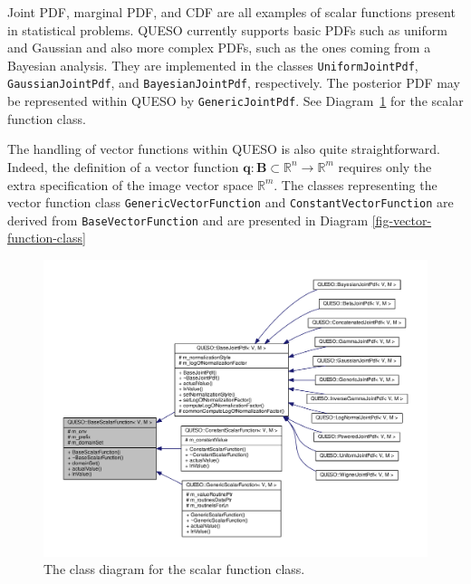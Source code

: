 Joint PDF, marginal PDF, and CDF are all examples of scalar functions present in statistical problems. 
QUESO currently supports basic PDFs such as uniform and Gaussian and also more complex PDFs, such as the ones coming from a Bayesian analysis. They are implemented in the classes \verb+UniformJointPdf+, \verb+GaussianJointPdf+, and \verb+BayesianJointPdf+, respectively. The posterior PDF may be represented within QUESO by \verb+GenericJointPdf+.
See Diagram~\ref{fig-scalar-function-class} for the scalar function class.

The handling of vector functions within QUESO is also quite straightforward. Indeed, the definition of a vector function $\mathbf{q}:\mathbf{B}\subset\mathbb{R}^n\rightarrow\mathbb{R}^m$ requires only the extra specification of the image vector space $\mathbb{R}^m$. The classes representing the vector function class \verb+GenericVectorFunction+ and \verb+ConstantVectorFunction+ are derived  from \verb+BaseVectorFunction+ and are presented in Diagram \ref{fig-vector-function-class} 
\begin{figure}[htpb]
\includegraphics[scale=0.65,clip=true]{rawfigs/base_scalar_function}
\vspace*{-1.5cm}
\caption{The class diagram for the scalar function class.}
\label{fig-scalar-function-class}
\end{figure}

